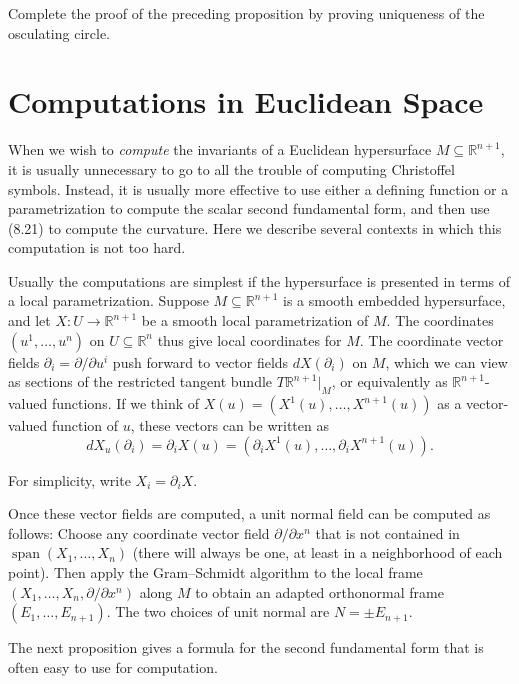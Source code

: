 \begin{exercise}
\label{exer:osculating-circle-uniqueness}
Complete the proof of the preceding proposition by proving uniqueness of the osculating circle.
\end{exercise}

\section{Computations in Euclidean Space}

When we wish to \emph{compute} the invariants of a Euclidean hypersurface $M \subseteq \mathbb{R}^{n+1}$, it is usually unnecessary to go to all the trouble of computing Christoffel symbols. Instead, it is usually more effective to use either a defining function or a parametrization to compute the scalar second fundamental form, and then use (8.21) to compute the curvature. Here we describe several contexts in which this computation is not too hard.

Usually the computations are simplest if the hypersurface is presented in terms of a local parametrization. Suppose $M \subseteq \mathbb{R}^{n+1}$ is a smooth embedded hypersurface, and let $X: U \to \mathbb{R}^{n+1}$ be a smooth local parametrization of $M$. The coordinates $(u^1,\ldots,u^n)$ on $U \subseteq \mathbb{R}^n$ thus give local coordinates for $M$. The coordinate vector fields $\partial_i = \partial/\partial u^i$ push forward to vector fields $dX(\partial_i)$ on $M$, which we can view as sections of the restricted tangent bundle $T\mathbb{R}^{n+1}|_M$, or equivalently as $\mathbb{R}^{n+1}$-valued functions. If we think of $X(u) = (X^1(u),\ldots,X^{n+1}(u))$ as a vector-valued function of $u$, these vectors can be written as
\[
dX_u(\partial_i) = \partial_i X(u) = (\partial_i X^1(u),\ldots,\partial_i X^{n+1}(u)).
\]

For simplicity, write $X_i = \partial_i X$.

Once these vector fields are computed, a unit normal field can be computed as follows: Choose any coordinate vector field $\partial/\partial x^{n}$ that is not contained in $\operatorname{span}(X_1,\ldots,X_n)$ (there will always be one, at least in a neighborhood of each point). Then apply the Gram--Schmidt algorithm to the local frame $(X_1,\ldots,X_n,\partial/\partial x^{n})$ along $M$ to obtain an adapted orthonormal frame $(E_1,\ldots,E_{n+1})$. The two choices of unit normal are $N = \pm E_{n+1}$.

The next proposition gives a formula for the second fundamental form that is often easy to use for computation.

